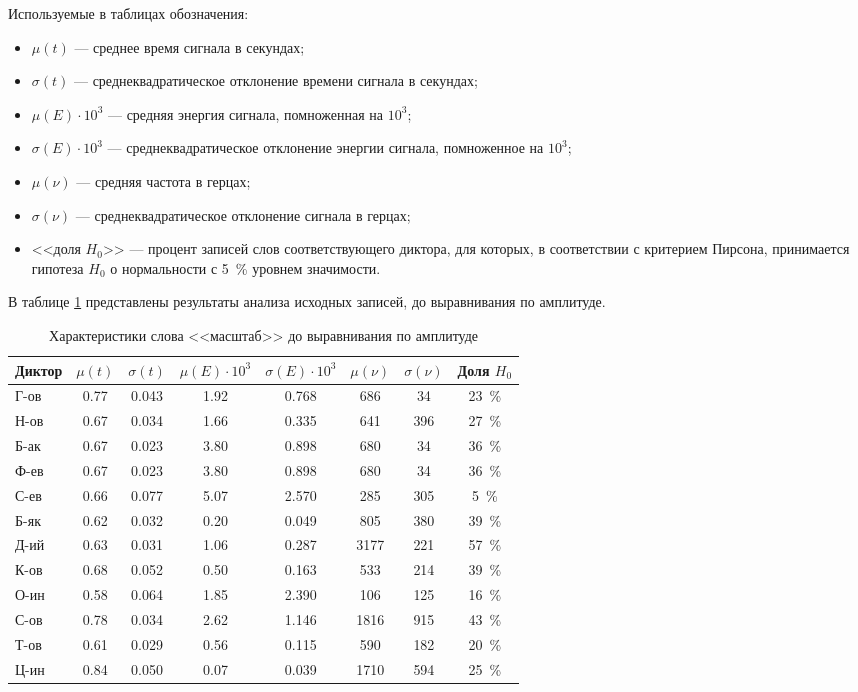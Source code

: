 Используемые в таблицах обозначения:
\begin{itemize}
	\item $\mu(t)$ --- среднее время сигнала в секундах;
	\item $\sigma(t)$ --- среднеквадратическое отклонение времени сигнала в секундах;
	\item $\mu(E) \cdot 10^3$ --- средняя энергия сигнала, помноженная на $10^3$;
	\item $\sigma(E) \cdot 10^3$ --- среднеквадратическое отклонение энергии сигнала, помноженное на $10^3$;
	\item $\mu(\nu)$ --- средняя частота в герцах;
	\item $\sigma(\nu)$ --- среднеквадратическое отклонение сигнала в герцах;
	\item <<доля $H_0$>> --- процент записей слов соответствующего диктора, для которых, в соответствии с критерием Пирсона, принимается гипотеза $H_0$ о нормальности с 5~\% уровнем значимости.
\end{itemize}

В таблице \ref{tab:wordCharacteristics} представлены результаты анализа исходных записей, до выравнивания по амплитуде.

\begin{table}[h]
	\centering
	\caption{Характеристики слова <<масштаб>> до выравнивания по амплитуде}
	\label{tab:wordCharacteristics}
	{\normalsize
		\begin{tabular}{| l | c | c | c | c | c | c | c |}
			\hline
			Диктор & \phantom{0} $\mu(t)$ \phantom{0} & \phantom{0}$\sigma(t)$\phantom{0} & $\mu(E) \cdot 10^3$ & $\sigma(E) \cdot 10^3$ & \phantom{0}$\mu(\nu)$\phantom{0} & \phantom{0}$\sigma(\nu)$\phantom{0} & Доля $H_0$ \\
			\hline
			Г-ов & 0.77	& 0.043 & 1.92 & 0.768 & 686  & 34  & 23~\% \\
			Н-ов & 0.67	& 0.034	& 1.66 & 0.335 & 641  & 396 & 27~\% \\
			Б-ак & 0.67	& 0.023	& 3.80 & 0.898 & 680  & 34  & 36~\% \\
			Ф-ев & 0.67	& 0.023	& 3.80 & 0.898 & 680  & 34  & 36~\% \\
			С-ев & 0.66	& 0.077	& 5.07 & 2.570 & 285  & 305 & 5~\% \\
			Б-як & 0.62	& 0.032	& 0.20 & 0.049 & 805  & 380 & 39~\% \\
			Д-ий & 0.63	& 0.031	& 1.06 & 0.287 & 3177 & 221 & 57~\% \\
			К-ов & 0.68	& 0.052	& 0.50 & 0.163 & 533  & 214 & 39~\% \\
			О-ин & 0.58	& 0.064	& 1.85 & 2.390 & 106  & 125 & 16~\% \\
			С-ов & 0.78	& 0.034	& 2.62 & 1.146 & 1816 & 915 & 43~\% \\
			Т-ов & 0.61	& 0.029	& 0.56 & 0.115 & 590  & 182 & 20~\% \\
			Ц-ин & 0.84	& 0.050	& 0.07 & 0.039 & 1710 & 594 & 25~\% \\
			\hline
		\end{tabular}
	}
\end{table}


